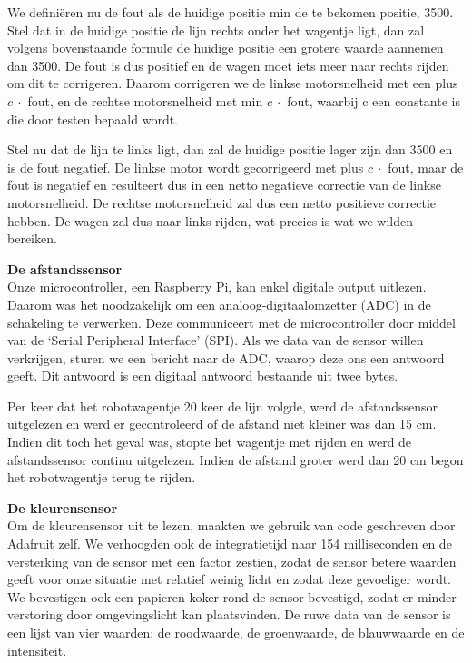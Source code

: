 \documentclass[a4paper,kulak]{kulakarticle}
\begin{document}
We definiëren nu de fout als de huidige positie min de te bekomen positie, 3500. Stel dat in de huidige positie de lijn rechts onder het wagentje ligt, dan zal volgens bovenstaande formule de huidige positie een grotere waarde aannemen dan 3500. De fout is dus positief en de wagen moet iets meer naar rechts rijden om dit te corrigeren. Daarom corrigeren we de linkse motorsnelheid met een plus $c \ \cdot$ fout, en de rechtse motorsnelheid met min $c \ \cdot$ fout, waarbij c een constante is die door testen bepaald wordt. 

Stel nu dat de lijn te links ligt, dan zal de huidige positie lager zijn dan 3500 en is de fout negatief. De linkse motor wordt gecorrigeerd met plus $c \  \cdot$ fout, maar de fout is negatief en resulteert dus in een netto negatieve correctie van de linkse motorsnelheid. De rechtse motorsnelheid zal dus een netto positieve correctie hebben. De wagen zal dus naar links rijden, wat precies is wat we wilden bereiken.

\textbf{\large De afstandssensor}\\
Onze microcontroller, een Raspberry Pi, kan enkel digitale output uitlezen. Daarom was het noodzakelijk om een analoog-digitaalomzetter (ADC) in de schakeling te verwerken. Deze communiceert met de microcontroller door middel van de `Serial Peripheral Interface' (SPI). Als we data van de sensor willen verkrijgen, sturen we een bericht naar de ADC, waarop deze ons een antwoord geeft. Dit antwoord is een digitaal antwoord bestaande uit twee bytes. 

Per keer dat het robotwagentje 20 keer de lijn volgde, werd de afstandssensor uitgelezen en werd er gecontroleerd of de afstand niet kleiner was dan 15 cm. Indien dit toch het geval was, stopte het wagentje met rijden en werd de afstandssensor continu uitgelezen. Indien de afstand groter werd dan 20 cm begon het robotwagentje terug te rijden. 

\textbf{\large De kleurensensor}\\
Om de kleurensensor uit te lezen, maakten we gebruik van code geschreven door Adafruit zelf. We verhoogden ook de integratietijd naar 154 milliseconden en de versterking van de sensor met een factor zestien, zodat de sensor betere waarden geeft voor onze situatie met relatief weinig licht en zodat deze gevoeliger wordt. We bevestigen ook een papieren koker rond de sensor bevestigd, zodat er minder verstoring door omgevingslicht kan plaatsvinden. De ruwe data van de sensor is een lijst van vier waarden: de roodwaarde, de groenwaarde, de blauwwaarde en de intensiteit. 
\end{document}
